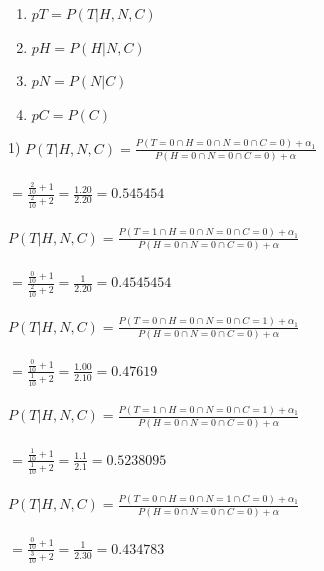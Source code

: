 \documentclass[a4paper]{article}
\begin{document}
\begin{enumerate}
\item $pT=P(T|H,N,C)$
\item $pH=P(H|N,C)$
\item $pN=P(N|C)$
\item $pC=P(C)$
\end{enumerate}
1) 
$P(T|H,N,C)=\frac{P(T=0 \cap  H=0 \cap  N=0 \cap  C=0) +\alpha_1}{P(H=0 \cap N=0 \cap C=0) +\alpha}$
\\
\\
$=\frac{\frac{2}{10}+1}{\frac{2}{10}+2}=\frac{1.20}{2.20}=0.545454$
\\
\\
$P(T|H,N,C)=\frac{P(T=1 \cap  H=0 \cap  N=0 \cap  C=0) +\alpha_1}{P(H=0 \cap N=0 \cap C=0) +\alpha}$
\\
\\
$=\frac{\frac{0}{10}+1}{\frac{2}{10}+2}=\frac{1}{2.20}=0.4545454$
\\
\\
$P(T|H,N,C)=\frac{P(T=0 \cap  H=0 \cap  N=0 \cap  C=1) +\alpha_1}{P(H=0 \cap N=0 \cap C=0) +\alpha}$
\\
\\
$=\frac{\frac{0}{10}+1}{\frac{1}{10}+2}=\frac{1.00}{2.10}=0.47619$
\\
\\
$P(T|H,N,C)=\frac{P(T=1 \cap  H=0 \cap  N=0 \cap  C=1) +\alpha_1}{P(H=0 \cap N=0 \cap C=0) +\alpha}$
\\
\\
$=\frac{\frac{1}{10}+1}{\frac{1}{10}+2}=\frac{1.1}{2.1}=0.5238095$
\\
\\
$P(T|H,N,C)=\frac{P(T=0 \cap  H=0 \cap  N=1 \cap  C=0) +\alpha_1}{P(H=0 \cap N=0 \cap C=0) +\alpha}$
\\
\\
$=\frac{\frac{0}{10}+1}{\frac{3}{10}+2}=\frac{1}{2.30}=0.434783$
\\
\\
\end{document}
